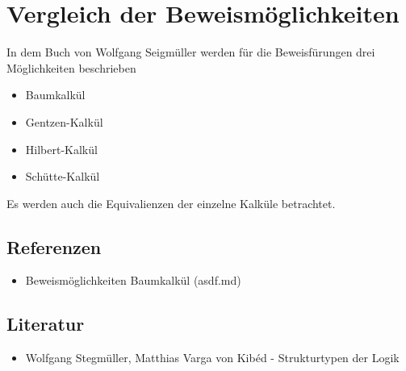 \documentclass{sajzk}
\begin{document}
\section{Vergleich der Beweismöglichkeiten} 
\label{ed3f}

In dem Buch von Wolfgang Seigmüller werden für die Beweisfürungen drei
Möglichkeiten beschrieben

\begin{itemize}
  \item Baumkalkül
  \item Gentzen-Kalkül
  \item Hilbert-Kalkül
  \item Schütte-Kalkül
\end{itemize}

Es werden auch die Equivalienzen der einzelne Kalküle betrachtet.

\subsection{Referenzen} 
\begin{itemize}
  \item Beweismöglichkeiten Baumkalkül (asdf.md)
\end{itemize}

\subsection{Literatur} 
\begin{itemize}
  \item Wolfgang Stegmüller, Matthias Varga von Kibéd - Strukturtypen der Logik
\end{itemize}
\end{document}
